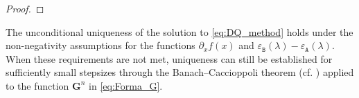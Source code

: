 \documentclass[a4paper, UKenglish, numberwithinsect, thm-restate]{tgdk-v2021}
\begin{document}
\begin{proof}
\end{proof}

\begin{remark}
    The unconditional uniqueness of the solution to \eqref{eq:DQ_method} holds under the non-negativity assumptions for the functions $\partial_x f(x)$ and $\varepsilon_{\texttt{B}}(\lambda)-\varepsilon_{\texttt{A}}(\lambda)$. When these requirements are not met,  uniqueness can still be established for sufficiently small stepsizes through the Banach–Caccioppoli theorem (cf. \cite[Theorem 9.23]{Rudin1976}) applied to the function $\bm{G}^n$ in \eqref{eq:Forma_G}. %
\end{remark}
\end{document}
